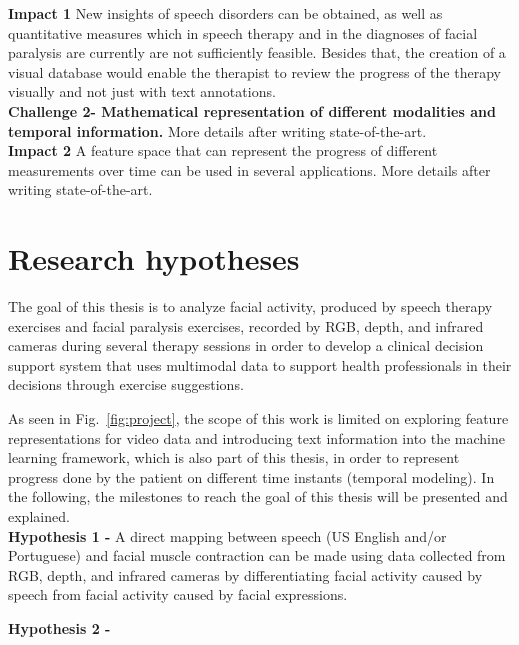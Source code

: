 \textbf{Impact 1}
New insights of speech disorders can be obtained, as well as quantitative measures which in speech therapy and in the diagnoses of facial paralysis are currently are not sufficiently feasible. Besides that, the creation of a visual database would enable the therapist to review the progress of the therapy visually and not just with text annotations. \\

\textbf{Challenge 2- Mathematical representation of different modalities and temporal information.} More details after writing state-of-the-art. \\

\textbf{Impact 2} A feature space that can represent the progress of different measurements over time can be used in several applications. More details after writing state-of-the-art.\\



\section{Research hypotheses}

The goal of this thesis is to analyze facial activity, produced by speech therapy exercises and facial paralysis exercises, recorded by RGB, depth, and infrared cameras during several therapy sessions in order to develop a clinical decision support system that uses multimodal data to support health professionals in their decisions through exercise suggestions.

As seen in Fig.~\ref{fig:project}, the scope of this work is limited on exploring feature representations for video data and introducing text information into the machine learning framework, which is also part of this thesis, in order to represent progress done by the patient on different time instants (temporal modeling). In the following, the milestones to reach the goal of this thesis will be presented and explained. \\

\textbf{Hypothesis 1 -} A direct mapping between speech (US English and/or Portuguese) and facial muscle contraction can be made using data collected from RGB, depth, and infrared cameras by differentiating facial activity caused by speech from facial activity caused by facial expressions.


\textbf{Hypothesis 2 -} 

